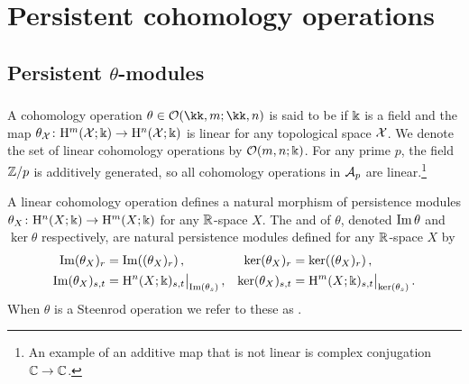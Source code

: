 
\section{Persistent cohomology operations}\label{s:steenrod}





\subsection{Persistent $\theta$-modules}

\subsubsection{}

A cohomology operation $\theta \in \cO(\kk,m; \kk,n)$ is said to be  if $\Bbbk$ is a field and the map $\theta_{\mathcal{X}} \colon \mathrm{H}^m(\mathcal{X}; \Bbbk) \to \mathrm{H}^n(\mathcal{X}; \Bbbk)$ is linear for any topological space $\mathcal{X}$.
We denote the set of linear cohomology operations by $\mathcal{O}(m,n;\Bbbk)$.
For any prime $p$, the field $\mathbb{Z}/p$ is additively generated, so all cohomology operations in $\mathcal{A}_p$ are linear.\footnote{An example of an additive map that is not linear is complex conjugation $\mathbb{C} \to \mathbb{C}$.}

A linear cohomology operation defines a natural morphism of persistence modules $\theta_X \colon \mathrm{H}^n(X; \Bbbk) \to \mathrm{H}^m(X; \Bbbk)$ for any $\mathbb{R}$-space $X$.
The  and  of $\theta$, denoted $\operatorname{Im}\theta$ and $\ker\theta$ respectively, are natural persistence modules defined for any $\mathbb{R}$-space $X$ by
\begin{align*}
	\operatorname{Im}(\theta_X)_r &= \operatorname{Im}((\theta_X)_r)\,, &
	\ker(\theta_X)_r &= \ker((\theta_X)_r)\,, \\
	\operatorname{Im}(\theta_X)_{s,t} &= \mathrm{H}^n(X;\Bbbk)_{s,t}\big|_{\operatorname{Im}(\theta_s)}\,, &
	\ker(\theta_X)_{s,t} &= \mathrm{H}^m(X;\Bbbk)_{s,t}\big|_{\ker(\theta_s)}\,.
\end{align*}
When $\theta$ is a Steenrod operation we refer to these as .

